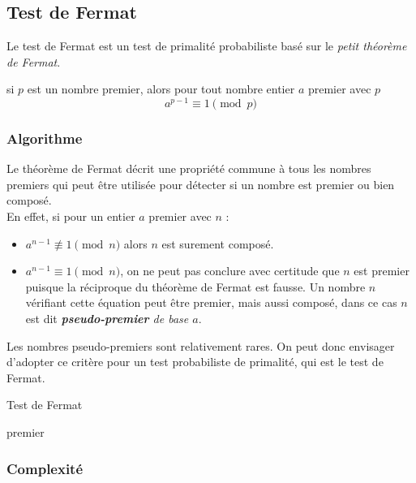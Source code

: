 		\subsection{Test de Fermat}
			Le test de Fermat est un test de primalité probabiliste basé sur le \textit{petit théorème de Fermat}.
			\vspace{-1.5em}\begin{adjustwidth}{1.5cm}{1.5cm} 
			\begin{Th}
				si $p$ est un nombre premier, alors pour tout nombre entier $a$ premier avec $p$
				\[a^{p-1}\equiv 1 \pmod p\]
			\end{Th}
			\end{adjustwidth}\vspace{0.5em}
			
			\subsubsection{Algorithme}
				Le théorème de Fermat décrit une propriété commune à tous les nombres premiers qui peut être utilisée pour détecter si un nombre est premier ou bien composé.\\
				En effet, si pour un entier $a$ premier avec $n$ : 
				\begin{itemize}
				\item $a^{n-1} \not\equiv 1 \pmod n$ alors $n$ est surement composé.
				\item $a^{n-1}\equiv 1 \pmod n$, on ne peut pas conclure avec certitude que $n$ est premier puisque la réciproque du théorème de Fermat est fausse. Un nombre $n$ vérifiant cette équation peut être premier, mais aussi composé, dans ce cas $n$ est dit \textit{\textbf{pseudo-premier} de base $a$}.
				\end{itemize}
				Les nombres pseudo-premiers sont relativement rares. On peut donc envisager d'adopter ce critère pour un test probabiliste de primalité, qui est le test de Fermat.
				
				\begin{algorithm}
					\caption{Test de Fermat\label{TF}}
				\Retour premier\;
				\end{algorithm}
		
			\subsubsection{Complexité}
